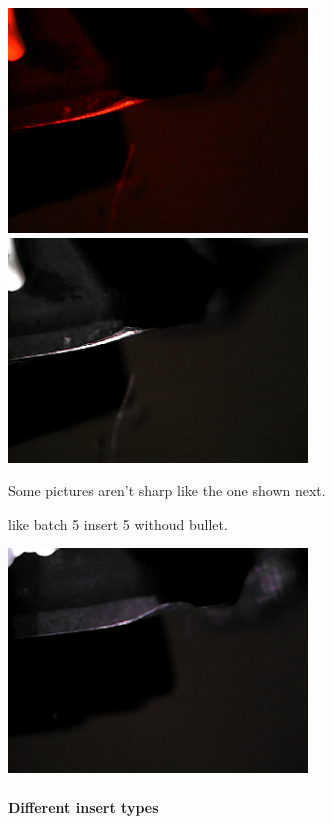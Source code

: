 \documentclass{scrartcl}
\begin{document}
\includegraphics[width=3.125000in, keepaspectratio=true]{./2_Spaghetti_dataset/b_003_p_006_l_006-011_red_nb.png}\includegraphics[width=3.125000in, keepaspectratio=true]{./2_Spaghetti_dataset/b_003_p_006_l_006-011_white_nb.png}



Some pictures aren't sharp like the one shown next.

like batch 5 insert 5 withoud bullet.

\includegraphics[width=3.125000in, keepaspectratio=true]{./2_Spaghetti_dataset/b_005_p_005_l_006-011_white_nb.png}



\paragraph{Different insert types}
\end{document}
